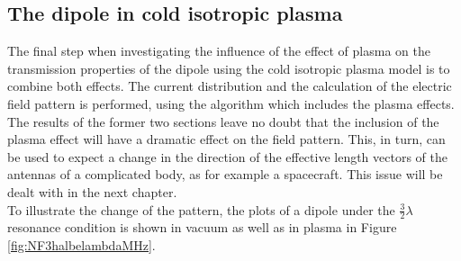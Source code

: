 \documentclass[a4paper,11pt]{thesis}
\begin{document}
\subsection{The dipole in cold isotropic plasma}
The final step when investigating the influence of the effect of plasma on the transmission properties of the dipole using the cold isotropic plasma model is to combine both effects. The current distribution and the calculation of the electric field pattern is performed, using the algorithm which includes the plasma effects. The results of the former two sections leave no doubt that the inclusion of the plasma effect will have a dramatic effect on the field pattern. This, in turn, can be used to expect a change in the direction of the effective length vectors of the antennas of a complicated body, as for example a spacecraft. This issue will be dealt with in the next chapter.\\

To illustrate the change of the pattern, the plots of a dipole under the $\frac{3}{2}\lambda$ resonance condition is shown in vacuum as well as in plasma in Figure \ref{fig:NF3halbelambdaMHz}.
\end{document}
